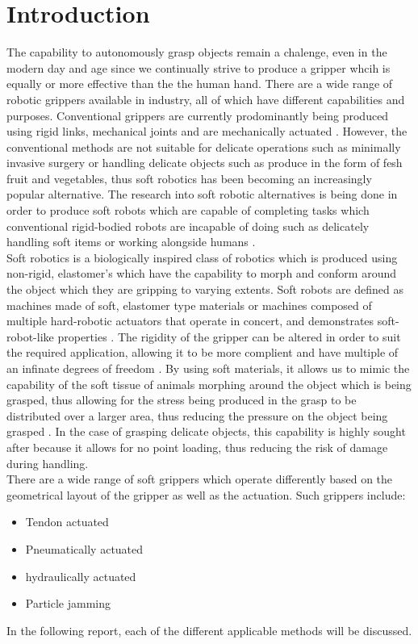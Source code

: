 \documentclass[11pt]{article}
\begin{document}
\section{Introduction}
The capability to autonomously grasp objects remain a chalenge, even in the modern day and age since we continually strive to produce a gripper whcih is equally or more effective than the the human hand. There are a wide range of robotic grippers available in industry, all of which have different capabilities and purposes. Conventional grippers are currently prodominantly being produced using rigid links, mechanical joints and are mechanically actuated \cite{ilievski2011soft}. However, the conventional methods are not suitable for delicate operations such as minimally invasive surgery or handling delicate objects such as produce in the form of fesh fruit and vegetables, thus soft robotics has been becoming an increasingly popular alternative. The research into soft robotic alternatives is being done in order to produce soft robots which are capable of completing tasks which conventional rigid-bodied robots are incapable of doing such as delicately handling soft items or working alongside humans \cite{bilodeau2015monolithic}.
\\
\newline
Soft robotics is a biologically inspired class of robotics which is produced using non-rigid, elastomer's which have the capability to morph and conform around the object which they are gripping to varying extents\cite{ilievski2011soft,bilodeau2015monolithic,mosadegh2014pneumatic,martinez2013robotic,marchese2015recipe}. Soft robots are defined as machines made of soft, elastomer type materials or machines composed of multiple hard-robotic actuators that operate in concert, and demonstrates soft-robot-like properties \cite{ilievski2011soft}. The rigidity of the gripper can be altered in order to suit the required application, allowing it to be more complient and have multiple of an infinate degrees of freedom \cite{hassan2015design}. By using soft materials, it allows us to mimic the capability of the soft tissue of animals morphing around the object which is being grasped, thus allowing for the stress being produced in the grasp to be distributed over a larger area, thus reducing the pressure on the object being grasped \cite{ilievski2011soft}. In the case of grasping delicate objects, this capability is highly sought after because it allows for no point loading, thus reducing the risk of damage  during handling.
\\
\newline
There are a wide range of soft grippers which operate differently based on the geometrical layout of the gripper as well as the actuation. Such grippers include:
\begin{itemize}
\item Tendon actuated
\item Pneumatically actuated
\item hydraulically actuated
\item Particle jamming
\end{itemize}
In the following report, each of the different applicable methods will be discussed.
\end{document}
